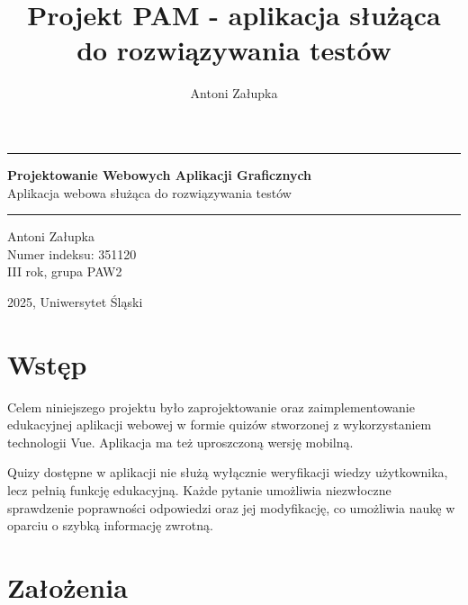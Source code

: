 \documentclass{article}
\title{Projekt PAM - aplikacja służąca do rozwiązywania testów}
\author{Antoni Załupka}
\begin{document}
	\thispagestyle{empty}
	
	
	\vspace{4cm}
	
	\rule{\linewidth}{2mm} 
	
	\begin{center}
		\huge \textbf{Projektowanie Webowych Aplikacji Graficznych} \\
		\huge {Aplikacja webowa służąca do rozwiązywania testów} \\
	\end{center}
	
	\rule{\linewidth}{0.5mm} 
	
	\vspace{2cm}
	
	\begin{center}
		\Large{Antoni Załupka} \\
		\Large{Numer indeksu: 351120} \\
		\Large{III rok, grupa PAW2} \\
		
	\end{center}
	
	
	\vspace{14cm}
	
	\begin{center}
		\Large{2025, Uniwersytet Śląski}
	\end{center}
	
	\newpage
	
	\tableofcontents
	
	\newpage
	
	\section{Wstęp}
	Celem niniejszego projektu było zaprojektowanie oraz zaimplementowanie edukacyjnej aplikacji webowej w formie quizów stworzonej z wykorzystaniem technologii Vue. Aplikacja ma też uproszczoną wersję mobilną. 
	
	Quizy dostępne w aplikacji nie służą wyłącznie weryfikacji wiedzy użytkownika, lecz pełnią funkcję edukacyjną. Każde pytanie umożliwia niezwłoczne sprawdzenie poprawności odpowiedzi oraz jej modyfikację, co umożliwia naukę w oparciu o szybką informację zwrotną.

    \section{Założenia}
\end{document}
